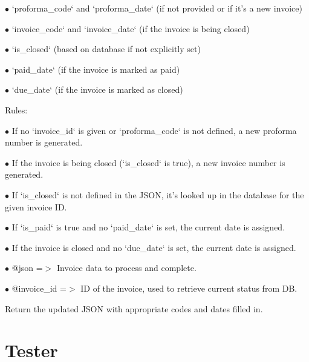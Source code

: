 \documentclass[a4paper]{article}
\begin{document}
\begin{compactitem}
\item[\color{myblue}$\bullet$] `proforma\_code` and `proforma\_date` (if not provided or if it's a new invoice)
\item[\color{myblue}$\bullet$] `invoice\_code` and `invoice\_date` (if the invoice is being closed)
\item[\color{myblue}$\bullet$] `is\_closed` (based on database if not explicitly set)
\item[\color{myblue}$\bullet$] `paid\_date` (if the invoice is marked as paid)
\item[\color{myblue}$\bullet$] `due\_date` (if the invoice is marked as closed)
\end{compactitem}

Rules:

\begin{compactitem}
\item[\color{myblue}$\bullet$] If no `invoice\_id` is given or `proforma\_code` is not defined, a new proforma number is generated.
\item[\color{myblue}$\bullet$] If the invoice is being closed (`is\_closed` is true), a new invoice number is generated.
\item[\color{myblue}$\bullet$] If `is\_closed` is not defined in the JSON, it's looked up in the database for the given invoice ID.
\item[\color{myblue}$\bullet$] If `is\_paid` is true and no `paid\_date` is set, the current date is assigned.
\item[\color{myblue}$\bullet$] If the invoice is closed and no `due\_date` is set, the current date is assigned.
\end{compactitem}

\begin{compactitem}
\item[\color{myblue}$\bullet$] @json       =$>$ Invoice data to process and complete.
\item[\color{myblue}$\bullet$] @invoice\_id =$>$ ID of the invoice, used to retrieve current status from DB.
\end{compactitem}

Return the updated JSON with appropriate codes and dates filled in.


\hypertarget{toc167}{}
\section{Tester}
\end{document}
